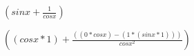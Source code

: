 \documentclass{proc}
\begin{document}
$( sin x + \frac{ 1 }{cos x }) $

$( ( cos x * 1 ) + \frac{ ( ( 0 * cos x ) - ( 1 * ( sin x * 1 ) ) ) }{cos x ^ 2 }) $
\end{document}
